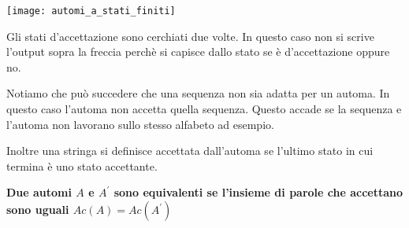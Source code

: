 \documentclass[a4paper, 10pt]{article}
\begin{document}
\texttt{[image: automi\_a\_stati\_finiti]}

Gli stati d'accettazione sono cerchiati due volte. In questo caso non si scrive l'output sopra la freccia perchè si capisce dallo stato se è d'accettazione oppure no.

Notiamo che può succedere che una sequenza non sia adatta per un automa. In questo caso l'automa non accetta quella sequenza. Questo accade se la sequenza e l'automa non lavorano sullo stesso alfabeto ad esempio.

Inoltre una stringa si definisce accettata dall'automa se l'ultimo stato in cui termina è uno stato accettante.

\textbf{Due automi $A$ e $A^{'}$ sono equivalenti se l'insieme di parole che accettano sono uguali $Ac(A) = Ac(A^{'})$}
\end{document}

